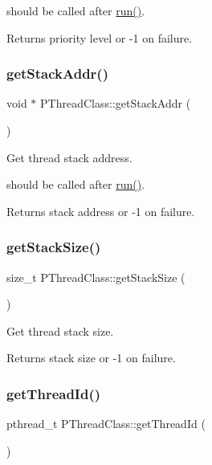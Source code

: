 should be called after \hyperlink{classPThreadClass_a9e60b014b8e8ba6892cc322b6ba183d8}{run()}. \begin{DoxyReturn}{Returns}
priority level or -\/1 on failure. 
\end{DoxyReturn}
\mbox{\label{classPThreadClass_a0ca8d7ebf843ee190c4cfdfe7909d3f5}} 
\subsubsection{\texorpdfstring{get\+Stack\+Addr()}{getStackAddr()}}
{\footnotesize\ttfamily void $\ast$ P\+Thread\+Class\+::get\+Stack\+Addr (\begin{DoxyParamCaption}{ }\end{DoxyParamCaption})}

Get thread stack address.

should be called after \hyperlink{classPThreadClass_a9e60b014b8e8ba6892cc322b6ba183d8}{run()}. \begin{DoxyReturn}{Returns}
stack address or -\/1 on failure. 
\end{DoxyReturn}
\mbox{\label{classPThreadClass_a2c7527172a945ef9b66f414c142bcefd}} 
\subsubsection{\texorpdfstring{get\+Stack\+Size()}{getStackSize()}}
{\footnotesize\ttfamily size\+\_\+t P\+Thread\+Class\+::get\+Stack\+Size (\begin{DoxyParamCaption}{ }\end{DoxyParamCaption})}

Get thread stack size. \begin{DoxyReturn}{Returns}
stack size or -\/1 on failure. 
\end{DoxyReturn}
\mbox{\label{classPThreadClass_a28368c1db23e60e2ab7e12acbd8eef83}} 
\subsubsection{\texorpdfstring{get\+Thread\+Id()}{getThreadId()}}
{\footnotesize\ttfamily pthread\+\_\+t P\+Thread\+Class\+::get\+Thread\+Id (\begin{DoxyParamCaption}{ }\end{DoxyParamCaption})\hspace{0.3cm}{\ttfamily [inline]}}

